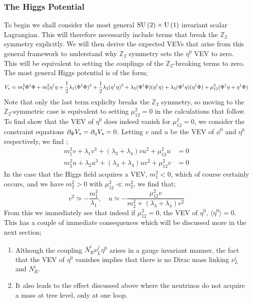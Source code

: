\documentclass[10pt]{article}
\begin{document}
\subsubsection{The Higgs Potential}
To begin we shall consider the most general $\textrm{SU}\left(2\right) \times \textrm{U}\left(1\right)$ invariant scalar Lagrangian. This will therefore necessarily include terms that break the $\mathbb{Z}_2$ symmetry explicitly. We will then derive the expected VEVs that arise from this general framework to understand why $\mathbb{Z}_2$ symmetry sets the $\eta^0$ VEV to zero. This will be equivalent to setting the couplings of the $\mathbb{Z}_2$-breaking terms to zero. The most general Higgs potential is of the form;
\begin{dmath}\label{eq:scalar lagrangian}
  V_s = m_1^2 \Phi\dagg \Phi + m_2^2 \eta\dagg \eta + \frac{1}{2}\lambda_1(\Phi\dagg\Phi)^2 + \frac{1}{2}\lambda_2(\eta\dagg\eta)^2 + \lambda_3 (\Phi\dagg\Phi)(\eta\dagg\eta) + \lambda_4 (\Phi\dagg\eta)(\eta\dagg\Phi) + \mu_{12}^2(\Phi\dagg\eta + \eta\dagg \Phi)
\end{dmath}
Note that only the last term expliclty breaks the $\mathbb{Z}_2$ symmetry, so moving to the $\mathbb{Z}_2$-symmetric case is equivalent to setting $\mu_{12}^2 = 0$ in the calculations that follow. To find show that the VEV of $\eta^0$ does indeed vanish for $\mu^2_{12} = 0$, we consider the constraint equations $\partial_{\Phi}V_s = \partial_{\eta}V_s = 0$. Letting $v$ and $u$ be the VEV of $\phi^0$ and $\eta^0$ respectively, we find \cite{Ma2001};
\begin{align}
  m_1^2 v + \lambda_1 v^3 + (\lambda_3 + \lambda_4)vu^2 + \mu^2_{12}u &= 0 \\
  m_2^2 u + \lambda_2 u^3 + (\lambda_3 + \lambda_4)uv^2 + \mu_{12}^2v &= 0
\end{align}
In the case that the Higgs field acquires a VEV, $m_1^2 < 0$, which of course certainly occurs, and we have $m_2^2 > 0$ with $\mu_{12}^2 \ll m_2^2$, we find that;
\begin{equation}
  v^2 \simeq -\frac{m_1^2}{\lambda_1}, \quad u \simeq -\frac{\mu_{12}^2 v}{m_2^2 + (\lambda_3 + \lambda_4)v^2}
\end{equation}
From this we immediately see that indeed if $\mu_{12}^2 = 0$, the VEV of $\eta^0$, $\langle \eta^0 \rangle = 0$. This has a couple of immediate consequences which will be discussed more in the next section;
\begin{enumerate}
  \item Although the coupling $\bar{N}^i_R \nu^j_L \eta^0$ arises in a gauge invariant manner, the fact that the VEV of $\eta^0$ vanishes implies that there is no Dirac mass linking $\nu^i_L$ and $N^i_R$.
  \item It also leads to the effect discussed above where the neutrinos do not acquire a mass at tree level, only at one loop.
\end{enumerate}
\end{document}
